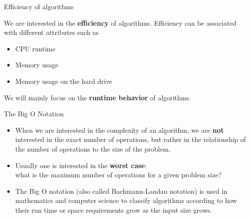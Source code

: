 
%






\begin{vbframe}{Efficiency of algorithms}

We are interested in the \textbf{efficiency} of algorithms. Efficiency can be associated with different attributes such as
  \begin{itemize}
    \item CPU runtime
    \item Memory usage
    \item Memory usage on the hard drive
  \end{itemize}

\lz

We will mainly focus on the \textbf{runtime behavior} of algorithms.

\end{vbframe}

\begin{vbframe}{The Big O Notation}

\begin{itemize}
\item When we are interested in the complexity of an algorithm, we are \textbf{not} interested in the exact number of operations, but rather in the relationship of the number of operations to the size of the problem.
  \item Usually one is interested in the \textbf{worst case}:\\
  what is the maximum number of operations for a given problem size?
  \item The Big O notation (also called Bachmann-Landau notation) is used in mathematics
  and computer science to classify algorithms according to how their run time or space requirements grow as the input size grows.
\end{itemize}


\end{vbframe}

